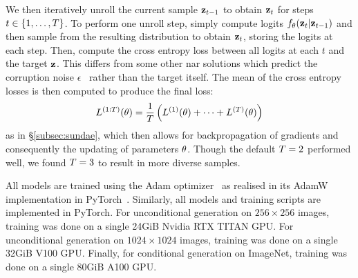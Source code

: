 We then iteratively unroll the current sample $\mathbf{z}_{t-1}$ to obtain
$\mathbf{z}_t$ for steps $t\in \{1, \dots, T\}$. To perform one unroll
step, simply compute logits $f_\theta(\mathbf{z}_t \vert \mathbf{z}_{t-1})$ and then
sample from the resulting distribution to obtain $\mathbf{z}_t$, storing the logits
at each step. Then, compute the cross entropy loss between all logits at each
$t$ and the target $\mathbf{z}$. This differs from some other \gls{nar} solutions
which predict the corruption noise $\epsilon$~\cite{ho2020ddpm} rather than the
target itself. The mean of the cross entropy losses is then computed to produce
the final loss: 
\begin{equation} 
    L^{(1:T)}(\theta) = \frac{1}{T} \left(L^{(1)}(\theta) +
    \dots + L^{(T)}(\theta) \right) 
\end{equation} 
as in \S\ref{subsec:sundae}, which then allows for backpropagation of gradients
and consequently the updating of parameters $\theta$. Though the
default $T = 2$ performed well, we found $T = 3$ to result
in more diverse samples.

All models are trained using the Adam optimizer~\cite{kingma2014adam} as
realised in its AdamW implementation in PyTorch~\cite{paszke2019pytorch}.
Similarly, all models and training scripts are implemented in PyTorch. For
unconditional generation on $256 \times 256$ images, training was done on a
single 24GiB Nvidia RTX TITAN GPU. For unconditional generation on $1024 \times
1024$ images, training was done on a single 32GiB V100 GPU. Finally, for
conditional generation on ImageNet, training was done on a single 80GiB A100
GPU.


